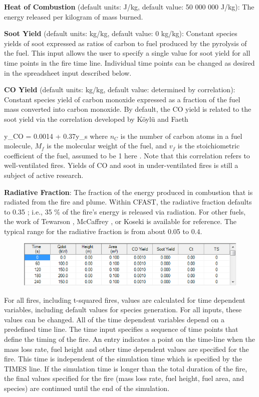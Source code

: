 \textbf{Heat of Combustion} (default units: J/kg, default value: 50 000 000 J/kg): The energy released per kilogram of mass burned.

\textbf{Soot Yield} (default units: kg/kg, default value: 0 kg/kg): Constant species yields of soot expressed as ratios of carbon to fuel produced by the pyrolysis of the fuel. This input allows the user to specify a single value for soot yield for all time points in the fire time line. Individual time points can be changed as desired in the spreadsheet input described below.

\textbf{CO Yield} (default units: kg/kg, default value: determined by correlation): Constant species yield of carbon monoxide expressed as a fraction of the fuel mass converted into carbon monoxide.  By default, the CO yield is related to the soot yield via the correlation developed by K\"oyl\"u and Faeth

\be
y_{CO} = 0.0014 + 0.37y_s \label{eq:Koylu}
\ee
where $n_C$ is the number of carbon atoms in a fuel molecule, $M_f$ is the molecular weight of the fuel, and $v_f$ is the stoichiometric coefficient of the fuel, assumed to be 1 here \cite{Koylu:1991}. Note that this correlation refers to well-ventilated fires. Yields of CO and soot in under-ventilated fires is still a subject of active research.

\textbf{Radiative Fraction}: The fraction of the energy produced in combustion that is radiated from the fire and plume. Within CFAST, the radiative fraction defaults to 0.35 ; i.e., 35 \% of the fire’s energy is released via radiation.  For other fuels, the work of Tewarson \cite{Tewarson:2003}, McCaffrey \cite{McCaffrey:1982}, or Koseki \cite{Koseki:1989} is available for reference.  The typical range for the radiative fraction is from about 0.05 to 0.4.

\begin{figure}[h!]
\begin{center}
\includegraphics[width=6.219in]{FIGURES/Input_File/Fire_Spreadsheet}
\end{center}
\end{figure}

For all fires, including t-squared fires, values are calculated for time dependent variables, including default values for species generation. For all inputs, these values can be changed. All of the time dependent variables depend on a predefined time line. The time input specifies a sequence of time points that define the timing of the fire.  An entry indicates a point on the time-line when the mass loss rate, fuel height and other time dependent values are specified for the fire.  This time is independent of the simulation time which is specified by the TIMES line. If the simulation time is longer than the total duration of the fire, the final values specified for the fire (mass loss rate, fuel height, fuel area, and species) are continued until the end of the simulation.

